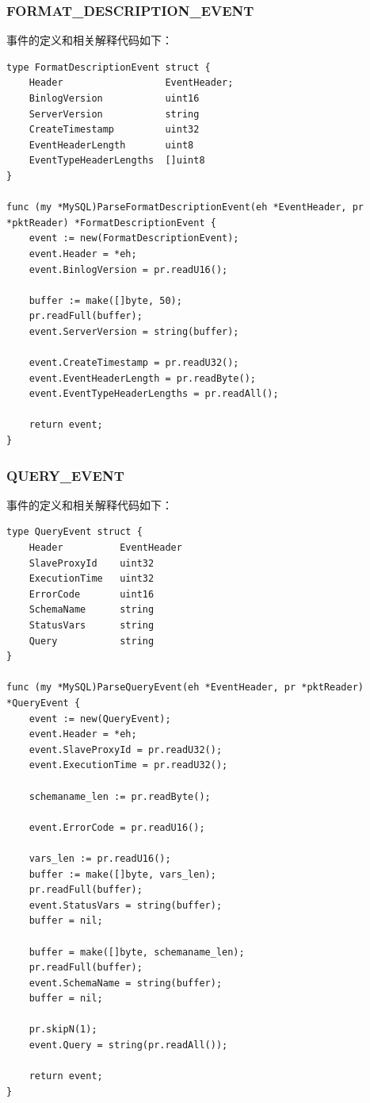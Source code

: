 \documentclass[a4paper, titlepage, 10pt, bookmark]{article}
\begin{document}
\subsubsection{FORMAT\_DESCRIPTION\_EVENT}
事件的定义和相关解释代码如下：
\begin{spacing}{1.0}
\begin{lstlisting}
type FormatDescriptionEvent struct {    
    Header                  EventHeader;
    BinlogVersion           uint16
    ServerVersion           string
    CreateTimestamp         uint32
    EventHeaderLength       uint8
    EventTypeHeaderLengths  []uint8
}

func (my *MySQL)ParseFormatDescriptionEvent(eh *EventHeader, pr *pktReader) *FormatDescriptionEvent {
    event := new(FormatDescriptionEvent);
    event.Header = *eh;
    event.BinlogVersion = pr.readU16();

    buffer := make([]byte, 50);
    pr.readFull(buffer);
    event.ServerVersion = string(buffer);

    event.CreateTimestamp = pr.readU32();
    event.EventHeaderLength = pr.readByte();
    event.EventTypeHeaderLengths = pr.readAll();

    return event;
}
\end{lstlisting}
\end{spacing}

\subsubsection{QUERY\_EVENT}
事件的定义和相关解释代码如下：
\begin{spacing}{1.0}
\begin{lstlisting}
type QueryEvent struct {
    Header          EventHeader
    SlaveProxyId    uint32
    ExecutionTime   uint32
    ErrorCode       uint16
    SchemaName      string
    StatusVars      string
    Query           string
}

func (my *MySQL)ParseQueryEvent(eh *EventHeader, pr *pktReader) *QueryEvent {
    event := new(QueryEvent);
    event.Header = *eh;
    event.SlaveProxyId = pr.readU32();
    event.ExecutionTime = pr.readU32();

    schemaname_len := pr.readByte();

    event.ErrorCode = pr.readU16();

    vars_len := pr.readU16();
    buffer := make([]byte, vars_len);
    pr.readFull(buffer);
    event.StatusVars = string(buffer);
    buffer = nil;

    buffer = make([]byte, schemaname_len);
    pr.readFull(buffer);
    event.SchemaName = string(buffer);
    buffer = nil;

    pr.skipN(1);
    event.Query = string(pr.readAll());

    return event;
}
\end{lstlisting}
\end{spacing}
\end{document}
